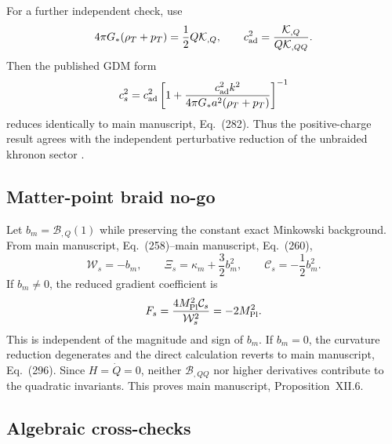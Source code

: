 \documentclass[aps,prd,reprint,onecolumn,notitlepage,nofootinbib,longbibliography,floatfix]{revtex4-2}
\theoremstyle{scstyle}
\theoremstyle{definition}
\theoremstyle{remark}
\newcommand{\mpl}{M_{\rm Pl}}
\newcommand{\cK}{\mathcal K}
\newcommand{\cB}{\mathcal B}
\begin{document}
For a further independent check, use
\begin{equation}
4\pi G_*(\rho_T+p_T)=\frac12Q\cK_{,Q},
\qquad
c_{\rm ad}^2=\frac{\cK_{,Q}}{Q\cK_{,QQ}}.
\label{eq:appendixGDMidentities}
\end{equation}
Then the published GDM form
\begin{equation}
c_s^2=c_{\rm ad}^2\left[
1+\frac{c_{\rm ad}^2k^2}{4\pi G_*a^2(\rho_T+p_T)}
\right]^{-1}
\label{eq:appendixGDMform}
\end{equation}
reduces identically to main manuscript, Eq.~(282). Thus the positive-charge result agrees with the independent perturbative reduction of the unbraided khronon sector \cite{BlanchetSkordis2024}.

\subsection{Matter-point braid no-go}

Let $b_m=\cB_{,Q}(1)$ while preserving the constant exact Minkowski background. From main manuscript, Eq.~(258)--main manuscript, Eq.~(260),
\begin{equation}
\mathcal W_s=-b_m,
\qquad
\Xi_s=\kappa_m+\frac32b_m^2,
\qquad
\mathcal C_s=-\frac12b_m^2.
\label{eq:appendixBraidNoGoCoefficients}
\end{equation}
If $b_m\ne0$, the reduced gradient coefficient is
\begin{equation}
F_s=\frac{4\mpl^2\mathcal C_s}{\mathcal W_s^2}=-2\mpl^2.
\label{eq:appendixBraidNoGoFs}
\end{equation}
This is independent of the magnitude and sign of $b_m$. If $b_m=0$, the curvature reduction degenerates and the direct calculation reverts to main manuscript, Eq.~(296). Since $H=\dot Q=0$, neither $\cB_{,QQ}$ nor higher derivatives contribute to the quadratic invariants. This proves main manuscript, Proposition~XII.6.

\subsection{Algebraic cross-checks}
\end{document}
